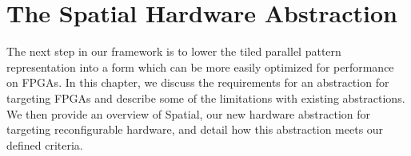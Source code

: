\chapter{The Spatial Hardware Abstraction}
\label{spatial}

The next step in our framework is to lower the tiled parallel pattern
representation into a form which can be more easily optimized for
performance on FPGAs. In this chapter, we discuss the requirements for
an abstraction for targeting FPGAs and describe some of the limitations with
existing abstractions. We then provide an overview of Spatial, our new
hardware abstraction for targeting reconfigurable hardware, and detail how
this abstraction meets our defined criteria.




